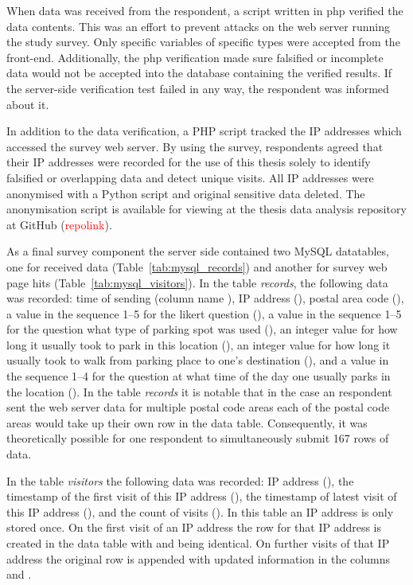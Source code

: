 When data was received from the respondent, a script written in \gls{php} verified the data contents. This was an effort to prevent attacks on the web server running the study survey. Only specific variables of specific types were accepted from the front-end. Additionally, the \gls{php} verification made sure falsified or incomplete data would not be accepted into the database containing the verified results. If the server-side verification test failed in any way, the respondent was informed about it. 

In addition to the data verification, a PHP script tracked the IP addresses which accessed the survey web server. By using the survey, respondents agreed that their IP addresses were recorded for the use of this thesis solely to identify falsified or overlapping data and detect unique visits. All IP addresses were anonymised with a Python script and original sensitive data deleted. The anonymisation script is available for viewing at the thesis data analysis repository at GitHub (\textcolor{red}{repolink}).

As a final survey component the server side contained two MySQL datatables, one for received data (Table~\ref{tab:mysql_records}) and another for survey web page hits (Table~\ref{tab:mysql_visitors}). In the table \textit{records}, the following data was recorded: time of sending (column name ), IP address (), postal area code (), a value in the sequence 1--5 for the likert question (), a value in the sequence 1--5 for the question what type of parking spot was used (), an integer value for how long it usually took to park in this location (), an integer value for how long it usually took to walk from parking place to one's destination (), and a value in the sequence 1--4 for the question at what time of the day one usually parks in the location (). In the table \textit{records} it is notable that in the case an respondent sent the web server data for multiple postal code areas each of the postal code areas would take up their own row in the data table. Consequently, it was theoretically possible for one respondent to simultaneously submit 167 rows of data.

In the table \textit{visitors} the following data was recorded: IP address (), the timestamp of the first visit of this IP address (), the timestamp of latest visit of this IP address (), and the count of visits (). In this table an IP address is only stored once. On the first visit of an IP address the row for that IP address is created in the data table with  and  being identical. On further visits of that IP address the original row is appended with updated information in the columns  and .

